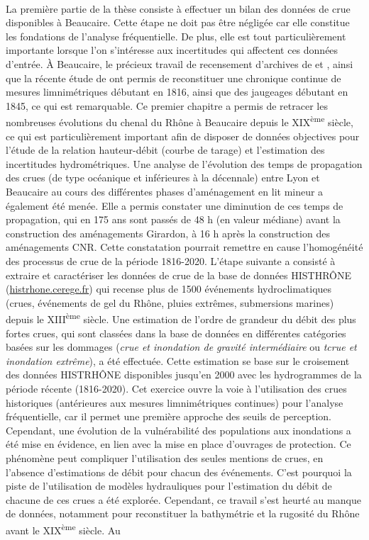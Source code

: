 	\paragraph{} La première partie de la thèse consiste à effectuer un bilan des données de crue disponibles à Beaucaire. Cette étape ne doit pas être négligée car elle constitue les fondations de l'analyse fréquentielle. De plus, elle est tout particulièrement importante lorsque l'on s'intéresse aux incertitudes qui affectent ces données d'entrée. À Beaucaire, le précieux travail de recensement d'archives de \citet{pichard_les_1995} et \citet{pichard_hydro-climatology_2017}, ainsi que la récente étude de \citet{bard_actualisation_2018} ont permis de reconstituer une chronique continue de mesures limnimétriques débutant en 1816, ainsi que des jaugeages débutant en 1845, ce qui est remarquable. Ce premier chapitre a permis de retracer les nombreuses évolutions du chenal du Rhône à Beaucaire depuis le XIX\textsuperscript{ème} siècle, ce qui est particulièrement important afin de disposer de données objectives pour l'étude de la relation hauteur-débit (courbe de tarage) et l'estimation des incertitudes hydrométriques. Une analyse de l'évolution des temps de propagation des crues (de type océanique et inférieures à la décennale) entre Lyon et Beaucaire au cours des différentes phases d'aménagement en lit mineur a également été menée. Elle a permis constater une diminution de ces temps de propagation, qui en 175 ans sont passés de 48 h (en valeur médiane) avant la construction des aménagements Girardon, à 16 h après la construction des aménagements CNR. Cette constatation pourrait remettre en cause l'homogénéité des processus de crue de la période 1816-2020. L'étape suivante a consisté à extraire et caractériser les données de crue de la base de données HISTHRÔNE (\url{histrhone.cerege.fr}) qui recense plus de 1500 événements hydroclimatiques (crues, événements de gel du Rhône, pluies extrêmes, submersions marines) depuis le XIII\textsuperscript{ème} siècle. Une estimation de l'ordre de grandeur du débit des plus fortes crues, qui sont classées dans la base de données en différentes catégories basées sur les dommages (\og \textit{crue et inondation de gravité intermédiaire}\fg{} ou \og \textit{tcrue et inondation extrême}\fg{}), a été effectuée. Cette estimation se base sur le croisement des données HISTRHÔNE disponibles jusqu'en 2000 avec les hydrogrammes de la période récente (1816-2020). Cet exercice ouvre la voie à l'utilisation des crues historiques (antérieures aux mesures limnimétriques continues) pour l'analyse fréquentielle, car il permet une première approche des seuils de perception. Cependant, une évolution de la vulnérabilité des populations aux inondations a été mise en évidence, en lien avec la mise en place d'ouvrages de protection. Ce phénomène peut compliquer l'utilisation des seules mentions de crues, en l'absence d'estimations de débit pour chacun des événements. C'est pourquoi la piste de l'utilisation de modèles hydrauliques pour l'estimation du débit de chacune de ces crues a été explorée. Cependant, ce travail s'est heurté au manque de données, notamment pour reconstituer la bathymétrie et la rugosité du Rhône avant le XIX\textsuperscript{ème} siècle. Au 